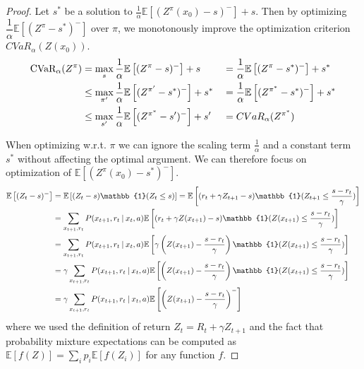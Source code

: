 \begin{proof}

Let $s^*$ be a solution to $\frac{1}{\alpha}\mathbb{E}\left[ (Z^\pi(x_0)-s)^-\right] + s$. Then by optimizing $\dfrac{1}{\alpha}\mathbb{E}
\left[ (Z^\pi-s^*)^-\right]$ over $\pi$, we monotonously improve the optimization criterion $CVaR_\alpha(Z(x_0))$.
\begin{align*}
\text{CVaR}_\alpha(Z^{\pi}) &= \max_{s}\dfrac{1}{\alpha}\mathbb{E}\left[ (Z^{\pi}-s)^-\right] + s &&= \dfrac{1}{\alpha}\mathbb{E}\left[ (Z^{\pi}-s^*)^-\right] + s^* \\
&\le \max_{\pi'}\dfrac{1}{\alpha}\mathbb{E} \left[ (Z^{\pi'}-s^*)^-\right] + s^* &&= \dfrac{1}{\alpha}\mathbb{E}\left[ (Z^{\pi^*}-s^*)^-\right] + s^*\\
 &\le \max_{s'}\dfrac{1}{\alpha}\mathbb{E}\left[ (Z^{\pi^*}-s')^-\right] + s' &&= CVaR_\alpha(Z^{\pi^*})
\end{align*}

When optimizing w.r.t. $\pi$ we can ignore the scaling term $\frac{1}{\alpha}$ and a constant term $s^*$ without affecting the optimal argument. We can therefore focus on optimization of $\mathbb{E}\left[ (Z^\pi(x_0)-s^*)^-\right]$.
\begin{equation}
\begin{split}
\mathbb{E}\left[(Z_t-s)^-\right] &= \mathbb{E}\left[(Z_t-s)\mathbb{1}(Z_t\le s)\right] = \mathbb{E}\left[(r_t + \gamma Z_{t+1}-s)\mathbb{1}(Z_{t+1}\le \dfrac{s - r_t}{\gamma})\right]\\
&= \sum_{x_{t+1}, r_t} P(x_{t+1}, r_t \given x_t, a)\mathbb{E}\left[(r_t + \gamma Z(x_{t+1})-s)\mathbb{1}(Z(x_{t+1})\le \dfrac{s - r_t}{\gamma})\right]\\
&= \sum_{x_{t+1}, r_t} P(x_{t+1}, r_t \given x_t, a)\mathbb{E}\left[\gamma\left(Z(x_{t+1})-\dfrac{s-r_t}{\gamma}\right)\mathbb{1}(Z(x_{t+1})\le \dfrac{s - r_t}{\gamma})\right]\\
&= \gamma\sum_{x_{t+1}, r_t} P(x_{t+1}, r_t \given x_t, a)\mathbb{E}\left[\left(Z(x_{t+1})-\dfrac{s-r_t}{\gamma}\right)\mathbb{1}(Z(x_{t+1})\le \dfrac{s - r_t}{\gamma})\right]\\
&= \gamma\sum_{x_{t+1}, r_t} P(x_{t+1}, r_t \given x_t, a)\mathbb{E}\left[\left(Z(x_{t+1}) - \dfrac{s - r_t}{\gamma}\right)^-\right]
\end{split}
\end{equation}
where we used the definition of return $Z_t = R_t + \gamma Z_{t+1}$ and the fact that probability mixture expectations can be computed as $\mathbb{E}[f(Z)] = \sum_i p_i \mathbb{E}[f(Z_i)]$ for any function $f$.


\end{proof}
